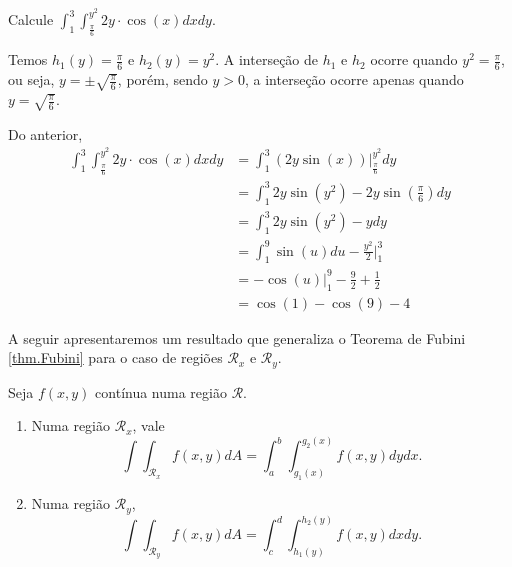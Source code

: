 \begin{example}
    Calcule \(\int_1^3 \int_{\frac{\pi}{6}}^{y^2} 2y\cdot \cos(x) dxdy\).

    Temos \(h_1(y) = \frac{\pi}{6}\) e \(h_2(y) = y^2\). A interseção de \(h_1\) e \(h_2\) ocorre quando \(y^2 = \frac{\pi}{6}\), ou seja, \(y = \pm \sqrt{\frac{\pi}{6}}\), porém, sendo \(y>0\), a interseção ocorre apenas quando \(y = \sqrt{\frac{\pi}{6}}\).

    Do anterior,
        \begin{align*}
            \int_1^3 \int_{\frac{\pi}{6}}^{y^2} 2y\cdot\cos(x) dx dy
                & = \int_1^3 (2y\sin(x))\bigg|_{\frac{\pi}{6}}^{y^2} dy \\
                & = \int_1^3 2y\sin(y^2) - 2y\sin\left( \frac{\pi}{6} \right) dy \\
                & = \int_1^3 2y\sin(y^2) - y dy \\
                & = \int_1^9 \sin(u) du - \frac{y^2}{2}\bigg|_1^3 \\
                & = -\cos(u)\bigg|_1^9 - \frac{9}{2} + \frac{1}{2} \\
                & = \cos(1) - \cos(9) - 4
        \end{align*}

\end{example}

A seguir apresentaremos um resultado que generaliza o Teorema de Fubini \ref{thm.Fubini} para o caso de regiões \(\mathcal{R}_x\) e \(\mathcal{R}_y\).

\begin{theorem}[Fubini]\label{thm.Fubini1}
    Seja \(f(x,y)\) contínua numa região \(\mathcal{R}\).
        \begin{enumerate}
            \item Numa região \(\mathcal{R}_x\), vale \[\int\int_{\mathcal{R}_x} f(x,y) dA = \int_a^b \int_{g_1(x)}^{g_2(x)} f(x,y) dy dx.\]
            \item Numa região \(\mathcal{R}_y\), \[\int\int_{\mathcal{R}_y} f(x,y) dA = \int_c^d \int_{h_1(y)}^{h_2(y)} f(x,y) dx dy.\]
        \end{enumerate}
\end{theorem}


